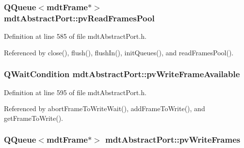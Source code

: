 \hypertarget{classmdt_abstract_port_a3d6bb9b420f64776d8fd077cf2b9b873}{
\subsubsection[{pv\-Read\-Frames\-Pool}]{\setlength{\rightskip}{0pt plus 5cm}Q\-Queue$<${\bf mdt\-Frame}$\ast$$>$ mdt\-Abstract\-Port\-::pv\-Read\-Frames\-Pool\hspace{0.3cm}{\ttfamily [protected]}}}\label{classmdt_abstract_port_a3d6bb9b420f64776d8fd077cf2b9b873}


Definition at line 585 of file mdt\-Abstract\-Port.\-h.



Referenced by close(), flush(), flush\-In(), init\-Queues(), and read\-Frames\-Pool().

\hypertarget{classmdt_abstract_port_a4c81c98680c98ad6802dccd30380459d}{
\subsubsection[{pv\-Write\-Frame\-Available}]{\setlength{\rightskip}{0pt plus 5cm}Q\-Wait\-Condition mdt\-Abstract\-Port\-::pv\-Write\-Frame\-Available\hspace{0.3cm}{\ttfamily [protected]}}}\label{classmdt_abstract_port_a4c81c98680c98ad6802dccd30380459d}


Definition at line 595 of file mdt\-Abstract\-Port.\-h.



Referenced by abort\-Frame\-To\-Write\-Wait(), add\-Frame\-To\-Write(), and get\-Frame\-To\-Write().

\hypertarget{classmdt_abstract_port_a12cd5c1ba100b018539ed909a481d6dc}{
\subsubsection[{pv\-Write\-Frames}]{\setlength{\rightskip}{0pt plus 5cm}Q\-Queue$<${\bf mdt\-Frame}$\ast$$>$ mdt\-Abstract\-Port\-::pv\-Write\-Frames\hspace{0.3cm}{\ttfamily [protected]}}}\label{classmdt_abstract_port_a12cd5c1ba100b018539ed909a481d6dc}


